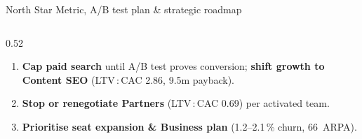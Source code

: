 \documentclass[aspectratio=169,10pt]{beamer}
\newcommand{\eur}{\,\texteuro}
\newcommand{\pc}{\,\%}
\begin{document}
\begin{frame}{North Star Metric, A/B test plan \& strategic roadmap}
\begin{columns}[T]
\begin{column}{0.52\textwidth}
\begin{tcolorbox}[colback=navylight,colframe=navy,boxrule=0.5pt,arc=2pt,left=4pt,right=4pt,top=1pt,bottom=1pt,boxsep=1pt,title={\scriptsize\bfseries 4 Recommendations before Series A}]
\begin{enumerate}
          \item \textbf{Cap paid search} until A/B test proves conversion; \textbf{shift growth to Content SEO} (LTV\,:\,CAC 2.86, 9.5m payback).
          \item \textbf{Stop or renegotiate Partners} (LTV\,:\,CAC 0.69) per activated team.
          \item \textbf{Prioritise seat expansion \& Business plan} (1.2--2.1\pc{} churn, 66\eur{} ARPA).
        \end{enumerate}
      \end{tcolorbox}
    \end{column}
  \end{columns}
\end{frame}
\end{document}
